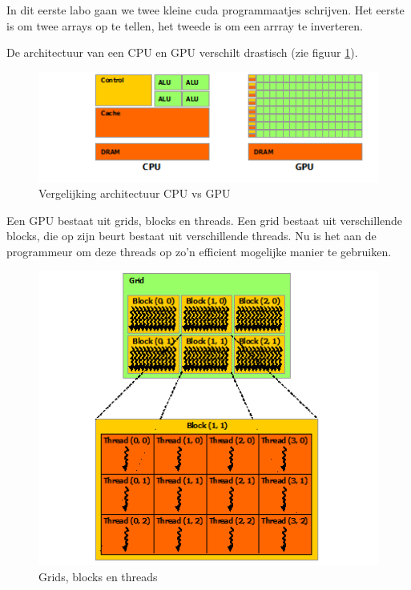 \documentclass[twoside,a4paper]{article}
\begin{document}
In dit eerste labo gaan we twee kleine cuda programmaatjes schrijven. Het eerste is om twee arrays op te tellen, het tweede is om een arrray te inverteren.
\cite{whatiscuda}

De architectuur van een CPU en GPU verschilt drastisch (zie figuur \ref{fig:cpugpu}).
\begin{figure}[H]
    \centering
    \includegraphics[scale=0.7]{gpu-devotes-more-transistors-to-data-processing.png}
    \caption{Vergelijking architectuur CPU vs GPU \cite{cudaprogrammingguide}}
    \label{fig:cpugpu}
\end{figure}

Een GPU bestaat uit grids, blocks en threads. Een grid bestaat uit verschillende blocks, die op zijn beurt bestaat uit verschillende threads. Nu is het aan de programmeur om deze threads op zo'n efficient mogelijke manier te gebruiken.
\cite{cudaprogrammingguide}

\begin{figure}[H]
    \centering
    \includegraphics[scale=0.6]{grid-of-thread-blocks.png}
    \caption{Grids, blocks en threads \cite{cudaprogrammingguide}}
    \label{fig:gridthreadblocks}
\end{figure}
\end{document}
